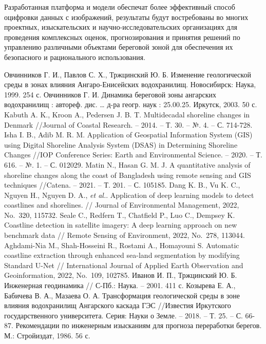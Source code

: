 \documentclass[732,fontsize=14pt,final]{studrep}
\begin{document}
Разработанная платформа и модели обеспечат более эффективный способ оцифровки данных с изображений, результаты будут востребованы во многих проектных, изыскательских и научно-исследовательских организациях для проведения комплексных оценок, прогнозирования и принятия решений по управлению различными объектами береговой зоной для обеспечения их безопасного и рационального использования.

\begin{thebibliography}{99}
Овчинников Г. И., Павлов С. Х., Тржцинский Ю. Б. Изменение геологической среды в зонах влияния Ангаро-Енисейских водохранилищ. Новосибирск: Наука, 1999. 254 с.
Овчинников Г. И. Динамика береговой зоны ангарских водохранилищ : автореф. дис. … д-ра геогр. наук : 25.00.25. Иркутск, 2003. 50 с.
Kabuth A. K., Kroon A., Pedersen J. B. T. Multidecadal shoreline changes in Denmark //Journal of Coastal Research. – 2014. – Т. 30. – №. 4. – С. 714-728.
Isha I. B., Adib M. R. M. Application of Geospatial Information System (GIS) using Digital Shoreline Analysis System (DSAS) in Determining Shoreline Changes //IOP Conference Series: Earth and Environmental Science. – 2020. – Т. 616. – №. 1. – С. 012029.
 Matin N., Hasan G. M. J. A quantitative analysis of shoreline changes along the coast of Bangladesh using remote sensing and GIS techniques //Catena. – 2021. – Т. 201. – С. 105185.
 Dang K. B., Vu K. C., Nguyen H., Nguyen D. A., \emph{et al.}. Application of deep learning models to detect coastlines and shorelines. // Journal of Environmental Management, 2022, No.~320, 115732.
 Seale C., Redfern T., Chatfield P., Luo C., Dempsey K. Coastline detection in satellite imagery: A deep learning approach on new benchmark data // Remote Sensing of Environment, 2022, No.~278, 113044.
 Aghdami-Nia M., Shah-Hosseini R., Rostami A., Homayouni S. Automatic coastline extraction through enhanced sea-land segmentation by modifying Standard U-Net // International Journal of Applied Earth Observation and Geoinformation, 2022, No.~109, 102785.
Иванов И. П., Тржцинский Ю. Б. Инженерная геодинамика // С-Пб.: Наука. – 2001. 411 с.
Козырева Е. А., Бабичева В. А., Мазаева О. А. Трансформация геологической среды в зоне влияния водохранилищ Ангарского каскада ГЭС //Известия Иркутского государственного университета. Серия: Науки о Земле. – 2018. – Т. 25. – С. 66-87.
Рекомендации по инженерным изысканиям для прогноза переработки берегов. М.: Стройиздат, 1986. 56 с.

\end{thebibliography}
\end{document}
